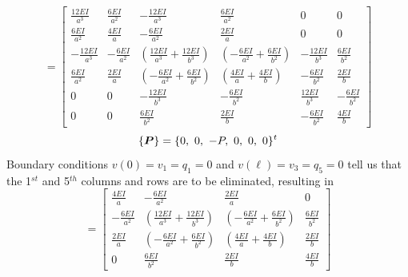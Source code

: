 \documentclass[11pt, oneside]{article}   	%
\newcommand{\vectr}[1]{\hbox{\boldmath$#1$}}
\begin{document}
\begin{equation}
   [ \vectr{K} ] =
   \left[
   \begin{array}{cccccc}
    \frac{12 {EI} }{a^3} & \frac{6 {EI} }{a^2} & -\frac{12 {EI} }{a^3} & \frac{6 {EI} }{a^2} & 0 & 0 \\[2ex]
    \frac{6 {EI}}{a^2} & \frac{4 {EI}}{a} & -\frac{6 {EI}}{a^2} & \frac{2 {EI}}{a} & 0 & 0 \\[2ex]
    -\frac{12 {EI} }{a^3} & -\frac{6 {EI} }{a^2} & 
    \left( \frac{12 {EI} }{a^3} +  \frac{12 {EI} }{b^3} \right)  &
    \left( -\frac{6 {EI} }{a^2}  + \frac{6 {EI} }{b^2} \right)  &
    -\frac{12 {EI} }{b^3} & \frac{6 {EI} }{b^2} \\[2ex]
    \frac{6 {EI}}{a^2} & \frac{2 {EI}}{a} &  
    \left(  -\frac{6 {EI}}{a^2}  + \frac{6 {EI}}{b^2} \right) &
    \left(  \frac{4 {EI}}{a}  +  \frac{4 {EI}}{b} \right)  & 
    -\frac{6 {EI}}{b^2} & \frac{2 {EI}}{b} \\[2ex]
    0 & 0 & -\frac{12 {EI} }{b^3} & -\frac{6 {EI} }{b^2} & \frac{12 {EI} }{b^3} & -\frac{6 {EI} }{b^2} \\[2ex]
    0 & 0 & \frac{6 {EI}}{b^2} & \frac{2 {EI}}{b} &  -\frac{6 {EI}}{b^2}  &  \frac{4 {EI}}{b}
   \end{array}
   \right]
   \label{D6}
\end{equation}
\begin{equation}
   \{ \vectr{P} \} = \{ 0,~ 0,~ -P,~ 0,~ 0,~ 0 \}^t
   \label{D7}
\end{equation}
Boundary conditions $v(0) = v_1 = q_1 =0$ and $v(\ell) = v_3 = q_5 =0$ tell us that the 1$^{st}$ and 5$^{th}$ columns and rows are to be eliminated, resulting in
\begin{equation}
   [ \vectr{K}_{ff} ] =
   \left[
   \begin{array}{cccc}
    \frac{4 {EI}}{a} & -\frac{6 {EI}}{a^2} & \frac{2 {EI}}{a} & 0 \\[2ex]
    -\frac{6 {EI} }{a^2} & 
    \left( \frac{12 {EI} }{a^3} +  \frac{12 {EI} }{b^3} \right)  &
    \left( -\frac{6 {EI} }{a^2}  + \frac{6 {EI} }{b^2} \right)  &
    \frac{6 {EI} }{b^2} \\[2ex]
    \frac{2 {EI}}{a} &  
    \left(  -\frac{6 {EI}}{a^2}  + \frac{6 {EI}}{b^2} \right) &
    \left(  \frac{4 {EI}}{a}  +  \frac{4 {EI}}{b} \right)  & 
    \frac{2 {EI}}{b} \\[2ex]
    0 & \frac{6 {EI}}{b^2} & \frac{2 {EI}}{b} & \frac{4 {EI}}{b}
   \end{array}
   \right]
   \label{D8}
\end{equation}
\end{document}
